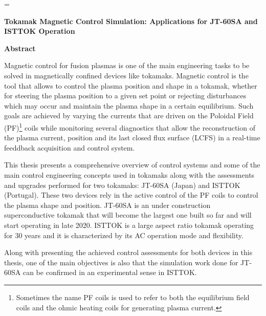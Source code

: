 





\usepackage{enumitem}
\usepackage{notoccite}
\usepackage{longtable}
\usepackage{multirow}
\usepackage{lipsum}
\usepackage{xcolor,colortbl}
\usepackage{mathtools}

\DeclareMathOperator*{\argmin}{arg\,min}
\DeclareMathOperator{\dist}{\mathit{dist}}


	\emergencystretch=\maxdimen
	
	
\textbf{	Tokamak Magnetic Control Simulation: Applications for JT-60SA and ISTTOK Operation}
	\smallskip
	
	\textbf{Abstract}
	\smallskip
	
	Magnetic control for fusion plasmas is one of the main engineering tasks to be solved in magnetically  confined devices like tokamaks. Magnetic control is the tool that allows to control the plasma position and shape in a tokamak, whether  for steering the plasma position to a given set point or rejecting disturbances which may occur and maintain the plasma shape in a certain equilibrium. Such goals are achieved by varying the currents that are driven on the Poloidal Field (PF)\footnote{Sometimes the name PF coils is used to refer to  both the equilibrium field coils and the ohmic heating coils for generating plasma current.} coils while monitoring several diagnostics that allow the reconstruction of the plasma current, position and its last closed flux surface (LCFS) in a real-time feeddback acquisition and control system.
	\smallskip
	
	This thesis presents a comprehensive overview of control systems and some of the main control engineering concepts used in tokamaks along with  the assessments and upgrades performed for two tokamaks: JT-60SA (Japan) and ISTTOK (Portugal). These two devices rely in the active control of the PF coils to control the plasma shape and position. JT-60SA is an under construction superconductive tokamak that will become the largest one built so far and will start operating in late 2020. ISTTOK is a large aspect ratio tokamak operating for 30 years and it is characterized by its AC operation mode and flexibility. \smallskip
	
	Along with presenting the achieved control assessments for both devices in this thesis, one of the main objectives  is also that the simulation work done for JT-60SA can be confirmed in an experimental sense in ISTTOK. \smallskip
	
